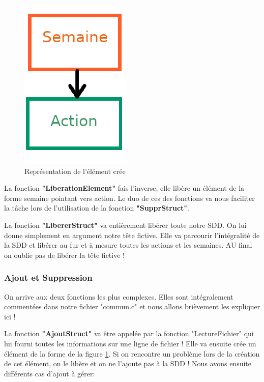 \documentclass[12pt,french]{article} %
\begin{document}
\begin{figure}[H]
	\includegraphics[scale=0.5]{nouvSemaine.png}
	\centering
	\caption{Représentation de l'élément crée}
	\label{element-default}
\end{figure}

La fonction \textbf{"LiberationElement"} fais l'inverse, elle libère un élément de la forme semaine pointant vers action. Le duo de ces des fonctions va nous faciliter la tâche lors de l'utilisation de la fonction \textbf{"SupprStruct"}.\newline

La fonction \textbf{"LibererStruct"} va entièrement libérer toute notre SDD. On lui donne simplement en argument notre tête fictive. Elle va parcourir l'intégralité de la SDD et libérer au fur et à mesure toutes les actions et les semaines. AU final on oublie pas de libérer la tête fictive !
 
 
\subsubsection{Ajout et Suppression}

On arrive aux deux fonctions les plus complexes.
Elles sont intégralement commentées dans notre fichier "commun.c" et nous allons brièvement les expliquer ici !\newline

La fonction \textbf{"AjoutStruct"} va être appelée par la fonction "LectureFichier" qui lui fourni toutes les informations sur une ligne de fichier ! Elle va ensuite crée un élément de la forme de la figure \ref{element-default}. Si on rencontre un problème lors de la création de cet élément, on le libère et on ne l'ajoute pas à la SDD !
Nous avons ensuite différents cas d'ajout à gérer:
\end{document}
